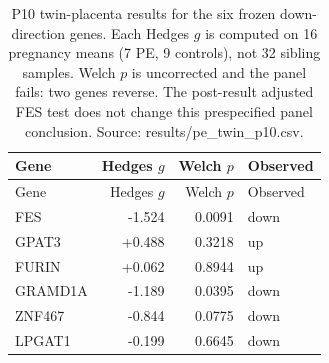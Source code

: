 \begin{longtable}{lrrl}
\caption{P10 twin-placenta results for the six frozen down-direction genes. Each Hedges $g$ is computed on 16 pregnancy means (7 PE, 9 controls), not 32 sibling samples. Welch $p$ is uncorrected and the panel fails: two genes reverse. The post-result adjusted FES test does not change this prespecified panel conclusion. Source: results/pe\_twin\_p10.csv.}\\
\hline Gene & Hedges $g$ & Welch $p$ & Observed\\\hline\endfirsthead
\hline Gene & Hedges $g$ & Welch $p$ & Observed\\\hline\endhead
FES & -1.524 & 0.0091 & down\\
GPAT3 & +0.488 & 0.3218 & up\\
FURIN & +0.062 & 0.8944 & up\\
GRAMD1A & -1.189 & 0.0395 & down\\
ZNF467 & -0.844 & 0.0775 & down\\
LPGAT1 & -0.199 & 0.6645 & down\\
\hline\end{longtable}
